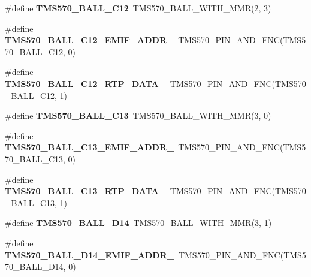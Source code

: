 \begin{DoxyCompactItemize}
\#define {\bfseries T\+M\+S570\+\_\+\+B\+A\+L\+L\+\_\+\+C12}~T\+M\+S570\+\_\+\+B\+A\+L\+L\+\_\+\+W\+I\+T\+H\+\_\+\+M\+MR(2, 3)
\item 
\mbox{\label{tms570lc4357-pins_8h_ac609a560d6631c51b475c1b07c897c97}} 
\#define {\bfseries T\+M\+S570\+\_\+\+B\+A\+L\+L\+\_\+\+C12\+\_\+\+E\+M\+I\+F\+\_\+\+A\+D\+D\+R\+\_}~T\+M\+S570\+\_\+\+P\+I\+N\+\_\+\+A\+N\+D\+\_\+\+F\+NC(T\+M\+S570\+\_\+\+B\+A\+L\+L\+\_\+\+C12, 0)
\item 
\mbox{\label{tms570lc4357-pins_8h_a77b1f38e4839050e6e7537f3f219c4fd}} 
\#define {\bfseries T\+M\+S570\+\_\+\+B\+A\+L\+L\+\_\+\+C12\+\_\+\+R\+T\+P\+\_\+\+D\+A\+T\+A\+\_}~T\+M\+S570\+\_\+\+P\+I\+N\+\_\+\+A\+N\+D\+\_\+\+F\+NC(T\+M\+S570\+\_\+\+B\+A\+L\+L\+\_\+\+C12, 1)
\item 
\mbox{\label{tms570lc4357-pins_8h_a3f60b3ca069714dc7c5f8578854b7519}} 
\#define {\bfseries T\+M\+S570\+\_\+\+B\+A\+L\+L\+\_\+\+C13}~T\+M\+S570\+\_\+\+B\+A\+L\+L\+\_\+\+W\+I\+T\+H\+\_\+\+M\+MR(3, 0)
\item 
\mbox{\label{tms570lc4357-pins_8h_ad6ff7babd233f7440f5c92e0936c03ad}} 
\#define {\bfseries T\+M\+S570\+\_\+\+B\+A\+L\+L\+\_\+\+C13\+\_\+\+E\+M\+I\+F\+\_\+\+A\+D\+D\+R\+\_}~T\+M\+S570\+\_\+\+P\+I\+N\+\_\+\+A\+N\+D\+\_\+\+F\+NC(T\+M\+S570\+\_\+\+B\+A\+L\+L\+\_\+\+C13, 0)
\item 
\mbox{\label{tms570lc4357-pins_8h_a67861843cebc379d3e9bfcf88ddfd8d8}} 
\#define {\bfseries T\+M\+S570\+\_\+\+B\+A\+L\+L\+\_\+\+C13\+\_\+\+R\+T\+P\+\_\+\+D\+A\+T\+A\+\_}~T\+M\+S570\+\_\+\+P\+I\+N\+\_\+\+A\+N\+D\+\_\+\+F\+NC(T\+M\+S570\+\_\+\+B\+A\+L\+L\+\_\+\+C13, 1)
\item 
\mbox{\label{tms570lc4357-pins_8h_a0b67269a8c32a1b0ab2fa43bb28636bf}} 
\#define {\bfseries T\+M\+S570\+\_\+\+B\+A\+L\+L\+\_\+\+D14}~T\+M\+S570\+\_\+\+B\+A\+L\+L\+\_\+\+W\+I\+T\+H\+\_\+\+M\+MR(3, 1)
\item 
\mbox{\label{tms570lc4357-pins_8h_ac8995940e74ce5d7efcff3dba8483503}} 
\#define {\bfseries T\+M\+S570\+\_\+\+B\+A\+L\+L\+\_\+\+D14\+\_\+\+E\+M\+I\+F\+\_\+\+A\+D\+D\+R\+\_}~T\+M\+S570\+\_\+\+P\+I\+N\+\_\+\+A\+N\+D\+\_\+\+F\+NC(T\+M\+S570\+\_\+\+B\+A\+L\+L\+\_\+\+D14, 0)

\end{DoxyCompactItemize}
